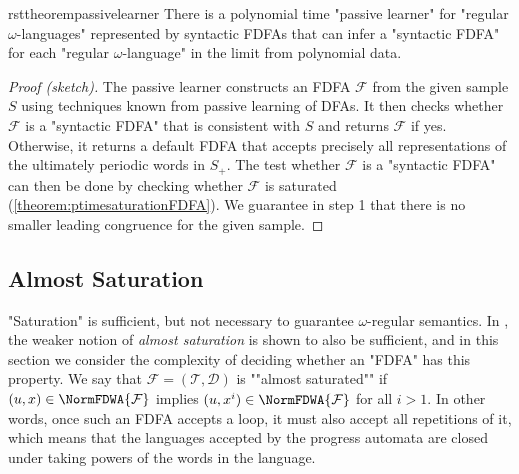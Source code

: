 \documentclass[a4paper,USenglish,cleveref,autoref,thm-restate]{lipics-v2021}
\newcommand{\mc}[1]{\ensuremath{\mathcal{#1}}}
\newcommand{\T}{\mc{T}}
\newcommand{\F}{\mc{F}}
\newcommand{\D}{\mc{D}}
\begin{document}
\begin{restatable}{rsttheorem}{passivelearner}
There is a polynomial time "passive learner" for "regular $\omega$-languages" represented by syntactic FDFAs that can infer a "syntactic FDFA" for each "regular $\omega$-language" in the limit from polynomial data.
\label{theorem:passivelearner}
\end{restatable}
\begin{proof}[Proof (sketch)]
  The passive learner constructs an FDFA $\F$ from the given sample $S$ using techniques known from passive learning of DFAs. It then checks whether $\F$ is a "syntactic FDFA" that is consistent with $S$ and returns $\F$ if yes.
  Otherwise, it returns a default FDFA that accepts precisely all representations of the ultimately periodic words in $S_+$. The test whether $\F$ is a "syntactic FDFA" can then be done by checking whether $\F$ is saturated (\cref{theorem:ptimesaturationFDFA}). We guarantee in step 1 that there is no smaller leading congruence for the given sample. \end{proof}
 \subsection{Almost Saturation}\label{section:almostsaturation}
"Saturation" is sufficient, but not necessary to guarantee $\omega$-regular semantics.
In \cite{LiST23}, the weaker notion of \emph{almost saturation} is shown to also be sufficient, and in this section we consider the complexity of deciding whether an "FDFA" has this property.
\AP
We say that $\F = (\T, \D)$ is ""almost saturated"" if $(u,x) \in \NormFDWA{\F}$ implies $(u,x^i) \in \NormFDWA{\F}$ for all $i > 1$.
In other words, once such an FDFA accepts a loop, it must also accept all repetitions of it, which means that the languages accepted by the progress automata are closed under taking powers of the words in the language.
\end{document}
